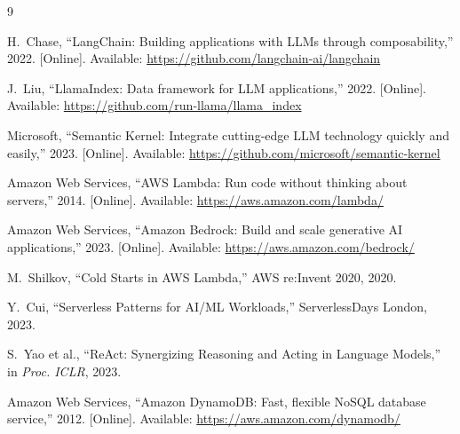 \documentclass[10pt,twocolumn,letterpaper]{article}
\begin{document}
\onecolumn
\begin{thebibliography}{9}

\footnotesize

H.~Chase, ``LangChain: Building applications with LLMs through composability,'' 2022. [Online]. Available: \url{https://github.com/langchain-ai/langchain}

J.~Liu, ``LlamaIndex: Data framework for LLM applications,'' 2022. [Online]. Available: \url{https://github.com/run-llama/llama_index}

Microsoft, ``Semantic Kernel: Integrate cutting-edge LLM technology quickly and easily,'' 2023. [Online]. Available: \url{https://github.com/microsoft/semantic-kernel}

Amazon Web Services, ``AWS Lambda: Run code without thinking about servers,'' 2014. [Online]. Available: \url{https://aws.amazon.com/lambda/}

Amazon Web Services, ``Amazon Bedrock: Build and scale generative AI applications,'' 2023. [Online]. Available: \url{https://aws.amazon.com/bedrock/}

M.~Shilkov, ``Cold Starts in AWS Lambda,'' AWS re:Invent 2020, 2020.

Y.~Cui, ``Serverless Patterns for AI/ML Workloads,'' ServerlessDays London, 2023.

S.~Yao et al., ``ReAct: Synergizing Reasoning and Acting in Language Models,'' in \emph{Proc. ICLR}, 2023.

Amazon Web Services, ``Amazon DynamoDB: Fast, flexible NoSQL database service,'' 2012. [Online]. Available: \url{https://aws.amazon.com/dynamodb/}

\end{thebibliography}
\end{document}
